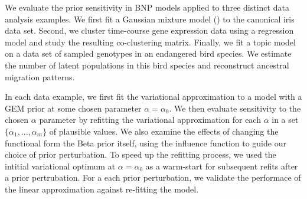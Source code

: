 We evaluate the prior sensitivity in BNP models applied to three distinct data analysis examples.
We first fit a Gaussian mixture model () to the canonical iris data set.
Second, we cluster time-course gene expression data using a regression model
and study the resulting co-clustering matrix.
Finally, we fit a topic model
on a data set of sampled genotypes in an endangered bird species.
We estimate the number of latent populations in this
bird species and reconstruct ancestral migration patterns.

In each data example, we first fit the variational approximation to a model
with a GEM prior at some chosen parameter $\alpha = \alpha_0$.
We then evaluate sensitivity to the chosen $\alpha$ parameter
by refitting the variational approximation for each $\alpha$
in a set $\{\alpha_1, ..., \alpha_m\}$ of plausible values.
We also examine the effects of changing the functional form the Beta prior itself,
using the influence function to guide our choice of prior perturbation.
To speed up the refitting process, we used the intitial
variational optimum at $\alpha = \alpha_0$ as a warm-start
for subsequent refits after a prior pertrubation.
For a each prior perturbation,
we validate the performace of the linear approximation against
re-fitting the model.
